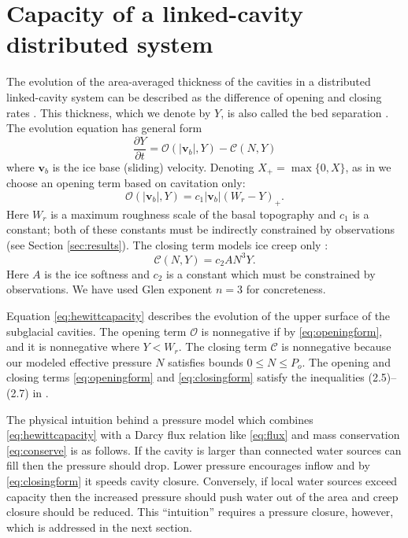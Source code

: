 \documentclass[gmd]{copernicus}   %
\newcommand\bv{\mathbf{v}}
\begin{document}
\section{Capacity of a linked-cavity distributed system} \label{sec:capacity}

The evolution of the area-averaged thickness of the cavities in a distributed linked-cavity system can be described as the difference of opening and closing rates \citep{Hewitt2011}.  This thickness, which we denote by $Y$, is also called the bed separation \citep{Bartholomausetal2011}.  The evolution equation has general form
\begin{equation}
\frac{\partial Y}{\partial t} = \mathcal{O}(|\bv_b|,Y) - \mathcal{C}(N,Y) \label{eq:hewittcapacity}
\end{equation}
where $\bv_b$ is the ice base (sliding) velocity.  Denoting $X_+= \max\{0,X\}$, as in \cite{Schoofetal2012} we choose an opening term based on cavitation only:
\begin{equation}
\mathcal{O}(|\bv_b|,Y) = c_1 |\bv_b| (W_r - Y)_+. \label{eq:openingform}
\end{equation}
Here $W_r$ is a maximum roughness scale of the basal topography and $c_1$ is a constant; both of these constants must be indirectly constrained by observations (see Section \ref{sec:results}).  The closing term models ice creep only \citep{Hewitt2011,Schoofetal2012}:
\begin{equation}
\mathcal{C}(N,Y) = c_2 A N^3 Y. \label{eq:closingform}
\end{equation}
Here $A$ is the ice softness and $c_2$ is a constant which must be constrained by observations.  We have used Glen exponent $n=3$ for concreteness.

Equation \eqref{eq:hewittcapacity} describes the evolution of the upper surface of the subglacial cavities.  The opening term $\mathcal{O}$ is nonnegative if by \eqref{eq:openingform}, and it is nonnegative where $Y<W_r$.  The closing term $\mathcal{C}$ is nonnegative because our modeled effective pressure $N$ satisfies bounds $0\le N \le P_o$.  The opening and closing terms \eqref{eq:openingform} and \eqref{eq:closingform} satisfy the inequalities (2.5)--(2.7) in \cite{Schoofetal2012}.

The physical intuition behind a pressure model which combines \eqref{eq:hewittcapacity} with a Darcy flux relation like \eqref{eq:flux} and mass conservation \eqref{eq:conserve} is as follows.  If the cavity is larger than connected water sources can fill then the pressure should drop.  Lower pressure encourages inflow and by \eqref{eq:closingform} it speeds cavity closure.  Conversely, if local water sources exceed capacity then the increased pressure should push water out of the area and creep closure should be reduced.  This ``intuition'' requires a pressure closure, however, which is addressed in the next section.
\end{document}
